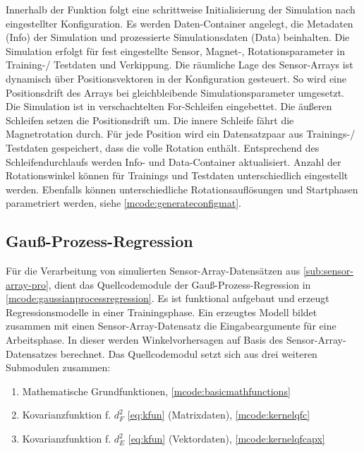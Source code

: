 \clearpage


Innerhalb der Funktion folgt eine schrittweise Initialisierung der Simulation nach eingestellter Konfiguration. Es werden Daten-Container angelegt, die Metadaten (Info) der Simulation und prozessierte Simulationsdaten (Data) beinhalten. Die Simulation erfolgt für fest eingestellte Sensor, Magnet-, Rotationsparameter in Training-/ Testdaten und Verkippung. Die räumliche Lage des Sensor-Arrays ist dynamisch über Positionsvektoren in der Konfiguration gesteuert. So wird eine Positionsdrift des Arrays bei gleichbleibende Simulationsparameter umgesetzt. Die Simulation ist in verschachtelten For-Schleifen eingebettet. Die äußeren Schleifen setzen die Positionsdrift um. Die innere Schleife fährt die Magnetrotation durch. Für jede Position wird ein Datensatzpaar aus Trainings-/ Testdaten gespeichert, dass die volle Rotation enthält. Entsprechend des Schleifendurchlaufs werden Info- und Data-Container aktualisiert. Anzahl der Rotationswinkel können für Trainings und Testdaten unterschiedlich eingestellt werden. Ebenfalls können unterschiedliche Rotationsauflösungen und Startphasen parametriert werden, siehe \autoref{mcode:generateconfigmat}.


\subsection{Gauß-Prozess-Regression}\label{sub:gpr-pro}


Für die Verarbeitung von simulierten Sensor-Array-Datensätzen aus \autoref{sub:sensor-array-pro}, dient das Quellcodemodule der Gauß-Prozess-Regression in \autoref{mcode:gaussianprocessregression}. Es ist funktional aufgebaut und erzeugt Regressionsmodelle in einer Trainingsphase. Ein erzeugtes Modell bildet zusammen mit einen Sensor-Array-Datensatz die Eingabeargumente für eine Arbeitsphase. In dieser werden Winkelvorhersagen auf Basis des Sensor-Array-Datensatzes berechnet. Das Quellcodemodul setzt sich aus drei weiteren Submodulen zusammen:


\begin{enumerate}
	\item Mathematische Grundfunktionen, \autoref{mcode:basicmathfunctions}
	\item Kovarianzfunktion f. $d_F^2$ \autoref{eq:kfun} (Matrixdaten), \autoref{mcode:kernelqfc}
	\item Kovarianzfunktion f. $d_E^2$ \autoref{eq:kfun} (Vektordaten), \autoref{mcode:kernelqfcapx}
\end{enumerate}



